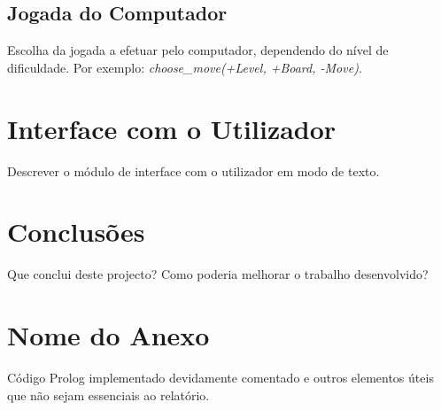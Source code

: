 \documentclass[a4paper]{article}
\begin{document}
\subsection{Jogada do Computador} Escolha da jogada a efetuar pelo computador, dependendo do nível de dificuldade. Por exemplo: \textit{choose\_move(+Level, +Board, -Move)}.


\section{Interface com o Utilizador}

Descrever o módulo de interface com o utilizador em modo de texto.


\section{Conclusões}
Que conclui deste projecto? Como poderia melhorar o trabalho desenvolvido?


\clearpage
%
%

\newpage
\appendix
\section{Nome do Anexo}
Código Prolog implementado devidamente comentado e outros elementos úteis que não sejam essenciais ao relatório.
\end{document}
